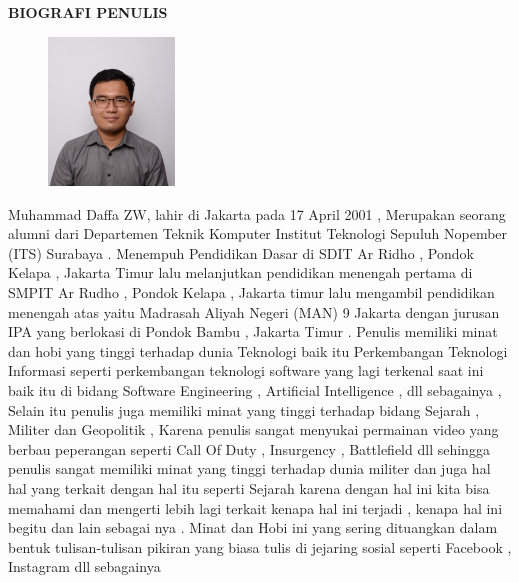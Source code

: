 \begin{center}
  \Large
  \textbf{BIOGRAFI PENULIS}
\end{center}


\vspace{2ex}

\begin{figure}
  \centering
  \vspace{-3ex}
  \includegraphics[width=0.3\textwidth]{gambar/bener/Foto Muhammad Daffa Z3.JPG}
  \vspace{-4ex}
\end{figure}

Muhammad Daffa ZW, lahir di Jakarta pada 17 April 2001 , Merupakan seorang alumni dari Departemen Teknik Komputer Institut Teknologi Sepuluh Nopember (ITS) Surabaya . Menempuh Pendidikan Dasar di SDIT Ar Ridho , Pondok Kelapa , Jakarta Timur lalu melanjutkan pendidikan menengah pertama di SMPIT Ar Rudho , Pondok Kelapa , Jakarta timur lalu mengambil pendidikan menengah atas yaitu Madrasah Aliyah Negeri (MAN) 9 Jakarta dengan jurusan IPA yang berlokasi di Pondok Bambu , Jakarta Timur . Penulis memiliki minat dan hobi yang tinggi terhadap dunia Teknologi baik itu Perkembangan Teknologi Informasi seperti perkembangan teknologi software yang lagi terkenal saat ini baik itu di bidang Software Engineering , Artificial Intelligence , dll sebagainya , Selain itu penulis juga memiliki minat yang tinggi terhadap bidang Sejarah , Militer dan Geopolitik , Karena penulis sangat menyukai permainan video yang berbau peperangan seperti Call Of Duty , Insurgency , Battlefield dll sehingga penulis sangat memiliki minat yang tinggi terhadap dunia militer dan juga hal hal yang terkait dengan hal itu seperti Sejarah karena dengan hal ini kita bisa memahami dan mengerti lebih lagi terkait kenapa hal ini terjadi , kenapa hal ini begitu dan lain sebagai nya . Minat dan Hobi ini yang sering dituangkan dalam bentuk tulisan-tulisan pikiran yang biasa tulis di jejaring sosial seperti Facebook , Instagram dll sebagainya 

